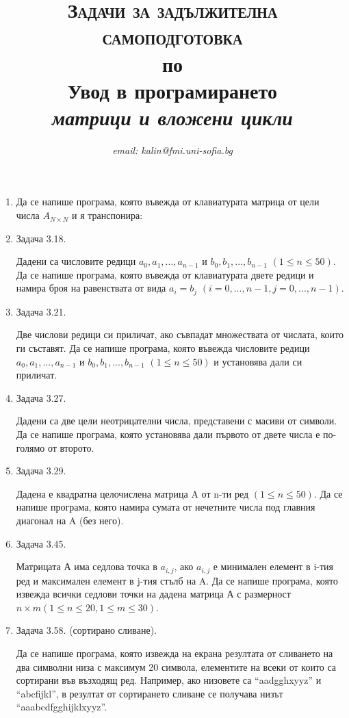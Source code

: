 \documentclass[12pt,a4paper]{article}
\author{\textit{email: kalin@fmi.uni-sofia.bg}}
\title{\textsc{Задачи за задължителна самоподготовка} \\
по \\
Увод в програмирането\\
\textit{матрици и вложени цикли}}
\begin{document}
\maketitle


\begin{enumerate}
	
	\item
	

		Да се напише програма, която въвежда от клавиатурата матрица от цели числа $A_{N\times N}$ и я транспонира:


	\item Задача 3.18. 

	Дадени са числовите редици $a_0, a_1, ..., a_{n-1}$ и $b_0, b_1, ..., b_{n-1}$ $(1 \leq n \leq 50)$. Да се напише програма, която въвежда от клавиатурата двете редици и намира броя на равенствата от вида $a_i = b_j$ $(i = 0, ..., n-1, j = 0, ..., n-1)$.


	\item Задача 3.21. 

	Две числови редици си приличат, ако съвпадат множествата от числата, които ги съставят. Да се напише програма, която въвежда числовите редици $a_0, a_1, ..., a_{n-1}$ и $b_0, b_1, ..., b_{n-1}$ $(1 \leq n \leq 50)$ и установява дали си приличат.

	\item Задача 3.27. 

	Дадени са две цели неотрицателни числа, представени с масиви от символи. Да се напише програма, която установява дали първото от двете числа е по-голямо от второто.


	\item Задача 3.29. 

Дадена е квадратна целочислена матрица A от n-ти ред $(1 \leq n \leq 50)$. Да се напише програма, която намира сумата от нечетните числа под главния диагонал на A (без него).

  \item Задача 3.45. 

  Матрицата А има седлова точка в $a_{i,j}$, ако $a_{i,j}$ е минимален елемент в i-тия ред и максимален елемент в j-тия стълб на A. Да се напише програма, която извежда всички седлови точки на дадена матрица А с размерност $n \times m (1 \leq n \leq 20, 1 \leq m \leq 30)$.


 \item Задача 3.58. (сортирано сливане). 

  Да се напише програма, която извежда на екрана резултата от сливането на два символни низа с максимум 20 символа, елементите на всеки от които са сортирани във възходящ ред. Например, ако низовете са ``aadgghxyyz'' и ``abcfijkl'', в резултат от сортирането сливане се получава низът ``aaabcdfgghijklxyyz''.


\end{enumerate}
\end{document}
